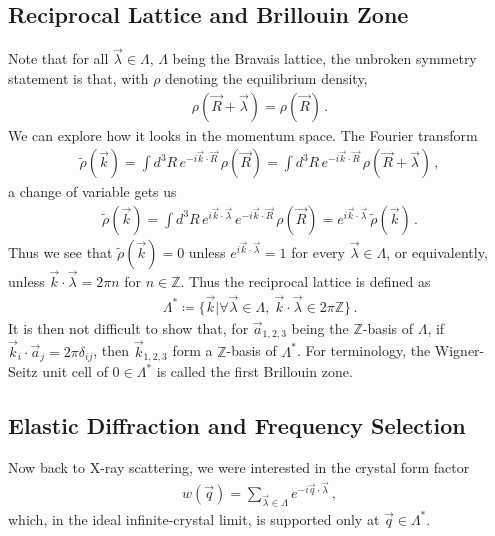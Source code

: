 \documentclass[11pt, oneside]{book}
\theoremstyle{break}
\theoremstyle{break}
\newcommand{\Z}{\mathbb{Z}}
\newcommand{\that}[1]{\widetilde{#1}}
\begin{document}
\subsection{Reciprocal Lattice and Brillouin Zone}
Note that for all $\vec{\lambda}\in \Lambda$, $\Lambda$ being the Bravais lattice, the unbroken symmetry statement is that, with $\rho$ denoting the equilibrium density,
\begin{align*}
\rho(\vec{R} + \vec{\lambda}) = \rho(\vec{R})\,.
\end{align*}
We can explore how it looks in the momentum space. The Fourier transform 
\begin{align*}
\that{\rho}(\vec{k}) = \int d^3R \, e^{-i \vec{k}\cdot \vec{R}} \, \rho(\vec{R}) = \int d^3R \, e^{-i\vec{k}\cdot \vec{R}} \, \rho(\vec{R}+\vec{\lambda})\,,
\end{align*}
a change of variable gets us 
\begin{align*}
\that{\rho}(\vec{k}) = \int d^3R \, e^{i\vec{k}\cdot \vec{\lambda}}\, e^{-i\vec{k}\cdot \vec{R}}\, \rho(\vec{R}) = e^{i\vec{k}\cdot \vec{\lambda}} \,\that{\rho}(\vec{k})\,.
\end{align*}
Thus we see that $\that{\rho}(\vec{k}) = 0$ unless $e^{i\vec{k}\cdot \vec{\lambda}} =1$ for every $\vec{\lambda}\in\Lambda$, or equivalently, unless $\vec{k}\cdot\vec{\lambda} = 2\pi n$ for $n \in \Z$. Thus the reciprocal lattice is defined as 
\begin{align*}
\Lambda^* \coloneqq \{ \vec{k} | \forall \vec{\lambda} \in \Lambda, \ \vec{k}\cdot \vec{\lambda} \in 2\pi \Z\}\,.
\end{align*}
It is then not difficult to show that, for $\vec{a}_{1,2,3}$ being the $\Z$-basis of $\Lambda$, if $\vec{k}_i \cdot \vec{a}_j = 2\pi \delta_{ij}$, then $\vec{k}_{1,2,3}$ form a $\Z$-basis of $\Lambda^*$. For terminology, the Wigner-Seitz unit cell of $0\in \Lambda^*$ is called the first Brillouin zone. \\

\subsection{Elastic Diffraction and Frequency Selection}
Now back to X-ray scattering, we were interested in the crystal form factor 
\begin{align*}
w(\vec{q}) = \sum_{\vec{\lambda} \in \Lambda} e^{-i\vec{q} \cdot \vec{\lambda}}\,,
\end{align*}
which, in the ideal infinite-crystal limit, is supported only at $\vec{q} \in \Lambda^*$. \\
\end{document}
